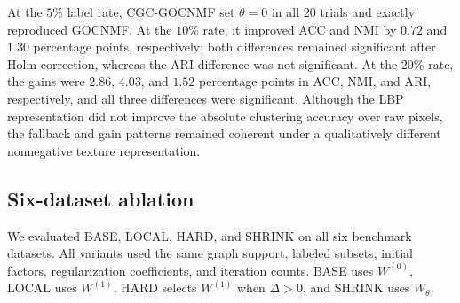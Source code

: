 \documentclass[11pt]{article}
\theoremstyle{remark}
\begin{document}
At the $5\%$ label rate, CGC-GOCNMF set $\theta=0$ in all 20 trials and exactly reproduced GOCNMF. At the $10\%$ rate, it improved ACC and NMI by $0.72$ and $1.30$ percentage points, respectively; both differences remained significant after Holm correction, whereas the ARI difference was not significant. At the $20\%$ rate, the gains were $2.86$, $4.03$, and $1.52$ percentage points in ACC, NMI, and ARI, respectively, and all three differences were significant. Although the LBP representation did not improve the absolute clustering accuracy over raw pixels, the fallback and gain patterns remained coherent under a qualitatively different nonnegative texture representation.


\subsection{Six-dataset ablation}

We evaluated BASE, LOCAL, HARD, and SHRINK on all six benchmark datasets. All variants used the same graph support, labeled subsets, initial factors, regularization coefficients, and iteration counts. BASE uses $W^{(0)}$, LOCAL uses $W^{(1)}$, HARD selects $W^{(1)}$ when $\Delta>0$, and SHRINK uses $W_{\theta}$.
\end{document}
